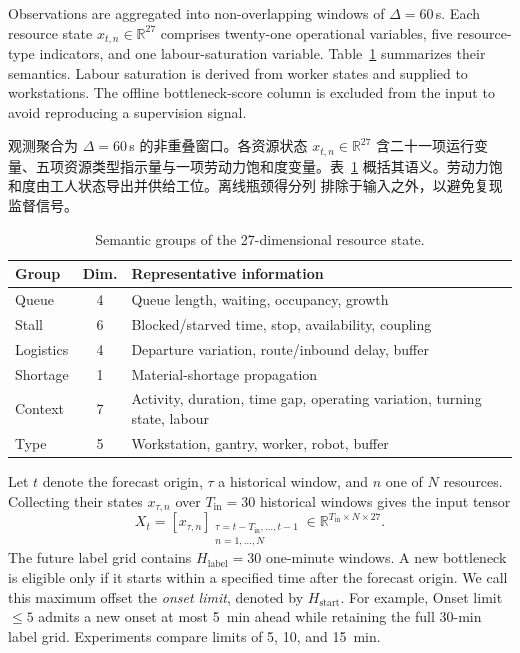 \documentclass[a4paper,fleqn]{cas-dc}
\newcommand{\zhpara}[1]{%
  \par\begingroup\small\color{black!72}\noindent #1\par\endgroup}
\begin{document}
Observations are aggregated into non-overlapping windows of $\Delta=60$\,s. Each resource state $x_{t,n}\in\mathbb{R}^{27}$ comprises twenty-one operational variables, five resource-type indicators, and one labour-saturation variable. Table~\ref{tab:feature-groups} summarizes their semantics. Labour saturation is derived from worker states and supplied to workstations. The offline bottleneck-score column is excluded from the input to avoid reproducing a supervision signal.

\zhpara{观测聚合为 $\Delta=60$\,s 的非重叠窗口。各资源状态 $x_{t,n}\in\mathbb{R}^{27}$ 含二十一项运行变量、五项资源类型指示量与一项劳动力饱和度变量。表~\ref{tab:feature-groups} 概括其语义。劳动力饱和度由工人状态导出并供给工位。离线瓶颈得分列 排除于输入之外，以避免复现监督信号。}


\begin{table}[pos=t]
\centering
\caption{Semantic groups of the 27-dimensional resource state.}
\label{tab:feature-groups}
\scriptsize
\setlength{\tabcolsep}{3pt}
\renewcommand{\arraystretch}{1.12}
\begin{tabularx}{\columnwidth}{@{}l c >{\raggedright\arraybackslash}X@{}}
\toprule
Group & Dim. & Representative information \\
\midrule
Queue & 4 & Queue length, waiting, occupancy, growth \\
Stall & 6 & Blocked/starved time, stop, availability, coupling \\
Logistics & 4 & Departure variation, route/inbound delay, buffer \\
Shortage & 1 & Material-shortage propagation \\
Context & 7 & Activity, duration, time gap, operating variation, turning state, labour \\
Type & 5 & Workstation, gantry, worker, robot, buffer \\
\bottomrule
\end{tabularx}
\end{table}

Let $t$ denote the forecast origin, $\tau$ a historical window, and $n$ one of $N$ resources. Collecting their states $x_{\tau,n}$ over $T_{\mathrm{in}}=30$ historical windows gives the input tensor
\begin{equation}
X_t=\left[x_{\tau,n}\right]_
{\substack{\tau=t-T_{\mathrm{in}},\ldots,t-1\\n=1,\ldots,N}}
\in\mathbb{R}^{T_{\mathrm{in}}\times N\times 27}.
\end{equation}
The future label grid contains $H_{\mathrm{label}}=30$ one-minute windows. A new bottleneck is eligible only if it starts within a specified time after the forecast origin. We call this maximum offset the \emph{onset limit}, denoted by $H_{\mathrm{start}}$. For example, Onset limit~$\leq5$ admits a new onset at most 5~min ahead while retaining the full 30-min label grid. Experiments compare limits of 5, 10, and 15~min.
\end{document}
